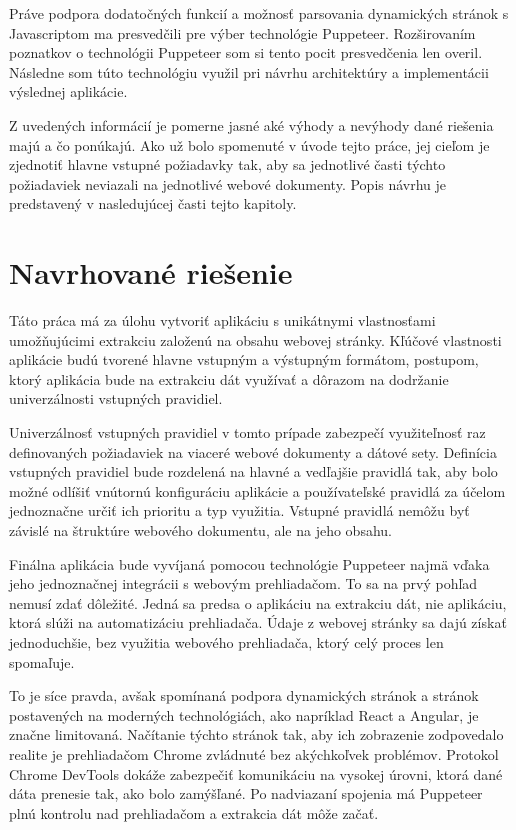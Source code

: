 Práve podpora dodatočných funkcií a možnosť parsovania dynamických stránok s Javascriptom ma presvedčili pre výber technológie Puppeteer. Rozširovaním poznatkov o technológii Puppeteer som si tento pocit presvedčenia len overil. Následne som túto technológiu využil pri návrhu architektúry a implementácii výslednej aplikácie.

\bigskip

Z uvedených informácií je pomerne jasné aké výhody a nevýhody dané riešenia majú a čo ponúkajú. Ako už bolo spomenuté v úvode tejto práce, jej cieľom je zjednotiť hlavne vstupné požiadavky tak, aby sa jednotlivé časti týchto požiadaviek neviazali na jednotlivé webové dokumenty. Popis návrhu je predstavený v nasledujúcej časti tejto kapitoly.

\newpage

\section{Navrhované riešenie}

Táto práca má za úlohu vytvoriť aplikáciu s unikátnymi vlastnosťami umožňujúcimi extrakciu založenú na obsahu webovej stránky. Kľúčové vlastnosti aplikácie budú tvorené hlavne vstupným a výstupným formátom, postupom, ktorý aplikácia bude na extrakciu dát využívať a dôrazom na dodržanie univerzálnosti vstupných pravidiel. 

Univerzálnosť vstupných pravidiel v tomto prípade zabezpečí využiteľnosť raz definovaných požiadaviek na viaceré webové dokumenty a dátové sety. Definícia vstupných pravidiel bude rozdelená na hlavné a vedľajšie pravidlá tak, aby bolo možné odlíšiť vnútornú konfiguráciu aplikácie a používateľské pravidlá za účelom jednoznačne určiť ich prioritu a typ využitia. Vstupné pravidlá nemôžu byť závislé na štruktúre webového dokumentu, ale na jeho obsahu.

Finálna aplikácia bude vyvíjaná pomocou technológie Puppeteer najmä vďaka jeho jednoznačnej integrácii s webovým prehliadačom. To sa na prvý pohľad nemusí zdať dôležité. Jedná sa predsa o aplikáciu na extrakciu dát, nie aplikáciu, ktorá slúži na automatizáciu prehliadača. Údaje z webovej stránky sa dajú získať jednoduchšie, bez využitia webového prehliadača, ktorý celý proces len spomaľuje. 

To je síce pravda, avšak spomínaná podpora dynamických stránok a stránok postavených na moderných technológiách, ako napríklad React a Angular, je značne limitovaná. Načítanie týchto stránok tak, aby ich zobrazenie zodpovedalo realite je prehliadačom Chrome zvládnuté bez akýchkoľvek problémov. Protokol Chrome DevTools dokáže zabezpečiť komunikáciu na vysokej úrovni, ktorá dané dáta prenesie tak, ako bolo zamýšľané. Po nadviazaní spojenia má Puppeteer plnú kontrolu nad prehliadačom a extrakcia dát môže začať. 


